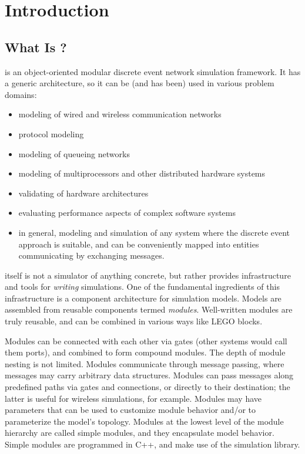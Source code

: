 \chapter{Introduction}
\label{cha:introduction}


\section{What Is {\opp}?}
\label{sec:introduction:what-is-omnetpp}

{\opp} is an object-oriented modular discrete event network simulation
framework. It has a generic architecture, so it can be (and has been)
used in various problem domains:

\begin{itemize}
  \item{modeling of wired and wireless communication networks}
  \item{protocol modeling}
  \item{modeling of queueing networks}
  \item{modeling of multiprocessors and other distributed hardware systems}
  \item{validating of hardware architectures}
  \item{evaluating performance aspects of complex software systems}
  \item{in general, modeling and simulation of
        any system where the discrete event approach is suitable, and
        can be conveniently mapped into entities communicating by exchanging
        messages.}
\end{itemize}

{\opp} itself is not a simulator of anything concrete, but rather
provides infrastructure and tools for \textit{writing} simulations. One of
the fundamental ingredients of this infrastructure is a component
architecture for simulation models. Models are assembled from reusable
components termed \textit{modules}. Well-written modules are truly reusable,
and can be combined in various ways like LEGO blocks.

Modules can be connected with each other via gates (other systems would
call them ports), and combined to form compound modules. The depth of
module nesting is not limited. Modules communicate through message passing,
where messages may carry arbitrary data structures. Modules can pass
messages along predefined paths via gates and connections, or directly to
their destination; the latter is useful for wireless simulations, for
example. Modules may have parameters that can be used to customize module
behavior and/or to parameterize the model's topology.
Modules at the lowest level of the module hierarchy are called
simple modules, and they encapsulate model behavior. Simple modules
are programmed in C++, and make use of the simulation library.

